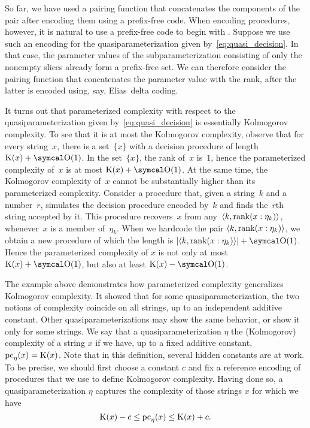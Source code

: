 \begin{example}[continued]
\label{ex:traditional_pc}%
  So far, we have used a pairing function that concatenates the components of the pair after encoding them using a prefix-free code.
  When encoding procedures, however, it is natural to use a prefix-free code to begin with \parencite{li2008introduction}.
  Suppose we use such an encoding for the quasiparameterization given by~\eqref{eq:quasi_decision}.
  In that case, the parameter values of the subparameterization consisting of only the nonempty slices already form a prefix-free set.
  We can therefore consider the pairing function that concatenates the parameter value with the rank, after the latter is encoded using, say, Elias~delta coding.

  It turns out that parameterized complexity with respect to the quasiparameterization given by~\eqref{eq:quasi_decision} is essentially Kolmogorov complexity.
  To see that it is at most the Kolmogorov complexity, observe that for every string~$x$, there is a set~$\{x\}$ with a decision procedure of length $\KC(x) + \bigO(1)$.
  In the set~$\{x\}$, the rank of~$x$ is~$1$, hence the parameterized complexity of~$x$ is at most $\KC(x) + \bigO(1)$.
  At the same time, the Kolmogorov complexity of~$x$ cannot be substantially higher than its parameterized complexity.
  Consider a procedure that, given a string~$k$ and a number~$r$, simulates the decision procedure encoded by~$k$ and finds the~$r$th string accepted by it.
  This procedure recovers~$x$ from any~${\langle k, \operatorname{rank}(x : \eta_k)\rangle}$, whenever~$x$ is a member of~$\eta_k$.
  When we hardcode the pair ${\langle k, \operatorname{rank}(x : \eta_k)\rangle}$, we obtain a new procedure of which the length is $\length{\pair{k}{\rank(x : \eta_k)}} + \bigO(1)$.
  Hence the parameterized complexity of $x$ is not only at most $\KC(x) + \bigO(1)$, but also at least $\KC(x) - \bigO(1)$.
\end{example}

The example above demonstrates how parameterized complexity generalizes Kolmogorov complexity.
It showed that for some quasiparameterization, the two notions of complexity coincide on all strings, up to an independent additive constant.
Other quasiparameterizations may show the same behavior, or show it only for some strings.
We say that a quasiparameterization $\eta$  the (Kolmogorov) complexity of a string $x$ if we have, up to a fixed additive constant, $\operatorname{pc}_\eta(x) = \operatorname{K}(x)$.
Note that in this definition, several hidden constants are at work.
To be precise, we should first choose a constant $c$ and fix a reference encoding of procedures that we use to define Kolmogorov complexity.
Having done so, a quasiparameterization $\eta$ captures the complexity of those strings $x$ for which we have
\begin{equation*}
  \operatorname{K}(x) - c \le \operatorname{pc}_\eta(x) \le \operatorname{K}(x) + c.
\end{equation*}

